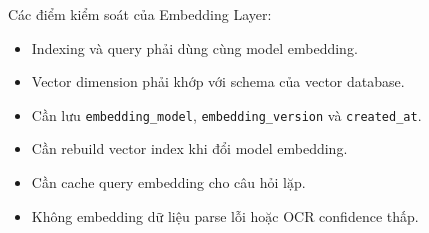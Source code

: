 Các điểm kiểm soát của Embedding Layer:

\begin{itemize}
    \item Indexing và query phải dùng cùng model embedding.
    \item Vector dimension phải khớp với schema của vector database.
    \item Cần lưu \texttt{embedding\_model}, \texttt{embedding\_version} và \texttt{created\_at}.
    \item Cần rebuild vector index khi đổi model embedding.
    \item Cần cache query embedding cho câu hỏi lặp.
    \item Không embedding dữ liệu parse lỗi hoặc OCR confidence thấp.
\end{itemize}
